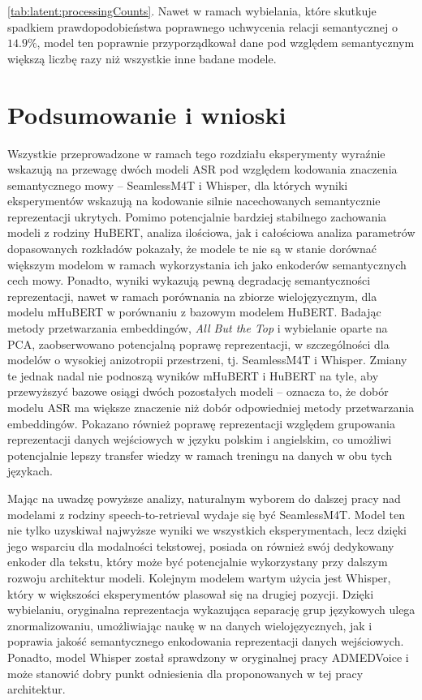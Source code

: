 \ref{tab:latent:processingCounts}. Nawet w ramach wybielania, które skutkuje spadkiem prawdopodobieństwa poprawnego uchwycenia relacji semantycznej o $14.9\%$, model ten poprawnie przyporządkował dane pod względem semantycznym większą liczbę razy niż wszystkie inne badane modele.


\section{Podsumowanie i wnioski}
Wszystkie przeprowadzone w ramach tego rozdziału eksperymenty wyraźnie wskazują na przewagę dwóch modeli ASR pod względem kodowania znaczenia semantycznego mowy -- SeamlessM4T i Whisper, dla których wyniki eksperymentów wskazują na kodowanie silnie nacechowanych semantycznie reprezentacji ukrytych. Pomimo potencjalnie bardziej stabilnego zachowania modeli z rodziny HuBERT, analiza ilościowa, jak i całościowa analiza parametrów dopasowanych rozkładów pokazały, że modele te nie są w stanie dorównać większym modelom w ramach wykorzystania ich jako enkoderów semantycznych cech mowy. Ponadto, wyniki wykazują pewną degradację semantyczności reprezentacji, nawet w ramach porównania na zbiorze wielojęzycznym, dla modelu mHuBERT w porównaniu z bazowym modelem HuBERT. Badając metody przetwarzania embeddingów, \textit{All But the Top} i wybielanie oparte na PCA, zaobserwowano potencjalną poprawę reprezentacji, w szczególności dla modelów o wysokiej anizotropii przestrzeni, tj. SeamlessM4T i Whisper. Zmiany te jednak nadal nie podnoszą wyników mHuBERT i HuBERT na tyle, aby przewyższyć bazowe osiągi dwóch pozostałych modeli -- oznacza to, że dobór modelu ASR ma większe znaczenie niż dobór odpowiedniej metody przetwarzania embeddingów. Pokazano również poprawę reprezentacji względem grupowania reprezentacji danych wejściowych w języku polskim i angielskim, co umożliwi potencjalnie lepszy transfer wiedzy w ramach treningu na danych w obu tych językach.

Mając na uwadzę powyższe analizy, naturalnym wyborem do dalszej pracy nad modelami z rodziny speech-to-retrieval wydaje się być SeamlessM4T. Model ten nie tylko uzyskiwał najwyższe wyniki we wszystkich eksperymentach, lecz dzięki jego wsparciu dla modalności tekstowej, posiada on również swój dedykowany enkoder dla tekstu, który może być potencjalnie wykorzystany przy dalszym rozwoju architektur modeli. Kolejnym modelem wartym użycia jest Whisper, który w większości eksperymentów plasował się na drugiej pozycji. Dzięki wybielaniu, oryginalna reprezentacja wykazująca separację grup językowych ulega znormalizowaniu, umożliwiając naukę w na danych wielojęzycznych, jak i poprawia jakość semantycznego enkodowania reprezentacji danych wejściowych. Ponadto, model Whisper został sprawdzony w oryginalnej pracy ADMEDVoice \cite{ADMEDVoice} i może stanowić dobry punkt odniesienia dla proponowanych w tej pracy architektur.
